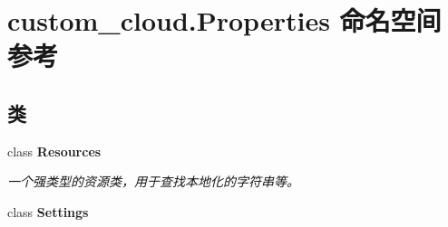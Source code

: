 \hypertarget{namespacecustom__cloud_1_1_properties}{}\section{custom\+\_\+cloud.\+Properties 命名空间参考}
\label{namespacecustom__cloud_1_1_properties}
\subsection*{类}
\begin{DoxyCompactItemize}
\item 
class {\bfseries Resources}
\begin{DoxyCompactList}\small\item\em 一个强类型的资源类，用于查找本地化的字符串等。 \end{DoxyCompactList}\item 
class {\bfseries Settings}
\end{DoxyCompactItemize}
